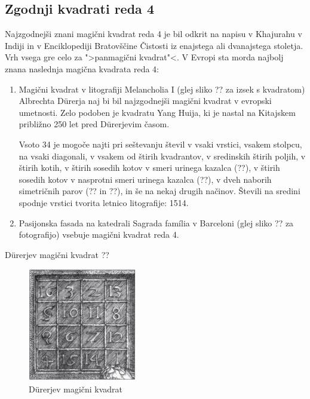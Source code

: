 \documentclass[a4paper,12pt]{article}
\theoremstyle{definition}
\theoremstyle{plain}
\begin{document}
\subsection{Zgodnji kvadrati reda 4}

Najzgodnejši znani magični kvadrat reda 4 je bil odkrit na napisu
v Khajurahu v Indiji in v Enciklopediji Bratovščine Čistosti iz enajstega
ali dvanajstega stoletja. Vrh vsega gre celo za ">panmagični kvadrat"<.
V Evropi sta morda najbolj znana naslednja magična kvadrata reda 4:
\begin{enumerate}
\item Magični kvadrat v litografiji Melancholia I (glej sliko ??
za izsek s kvadratom) Albrechta Dürerja naj bi bil najzgodnejši magični kvadrat
v evropski umetnosti. Zelo podoben je kvadratu Yang Huija, ki je nastal na Kitajskem
približno 250 let pred Dürerjevim časom.

Vsoto 34 je mogoče najti pri seštevanju števil v vsaki vrstici, vsakem stolpcu,
na vsaki diagonali, v vsakem od štirih kvadrantov, v sredinskih štirih poljih,
v štirih kotih, v štirih sosedih kotov v smeri urinega kazalca (??), v
štirih sosedih kotov v nasprotni smeri urinega kazalca (??), v dveh naborih
simetričnih parov (?? in ??), in še na nekaj drugih načinov.
Števili na sredini spodnje vrstici tvorita letnico litografije: 1514.

\item Pasijonska fasada na katedrali Sagrada família v Barceloni
(glej sliko ?? za fotografijo) vsebuje magični kvadrat reda 4.
\end{enumerate}
Dürerjev magični kvadrat ??



\begin{figure}[!ht]
\centering
\caption{Dürerjev magični kvadrat}
\label{fig:durer}
\includegraphics[scale=1.3]{durer.png}
\end{figure}
\end{document}

